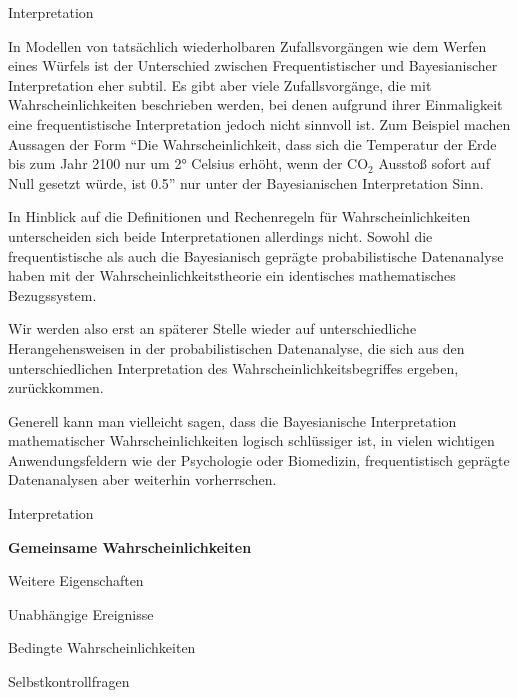 \documentclass[
  8pt,
  ignorenonframetext,
]{beamer}
\begin{document}
\begin{frame}{Interpretation}
\protect\hypertarget{interpretation-2}{}
\small

In Modellen von tatsächlich wiederholbaren Zufallsvorgängen wie dem
Werfen eines Würfels ist der Unterschied zwischen Frequentistischer und
Bayesianischer Interpretation eher subtil. Es gibt aber viele
Zufallsvorgänge, die mit Wahrscheinlichkeiten beschrieben werden, bei
denen aufgrund ihrer Einmaligkeit eine frequentistische Interpretation
jedoch nicht sinnvoll ist. Zum Beispiel machen Aussagen der Form ``Die
Wahrscheinlichkeit, dass sich die Temperatur der Erde bis zum Jahr 2100
nur um 2° Celsius erhöht, wenn der CO\(_2\) Ausstoß sofort auf Null
gesetzt würde, ist 0.5'' nur unter der Bayesianischen Interpretation
Sinn.

In Hinblick auf die Definitionen und Rechenregeln für
Wahrscheinlichkeiten unterscheiden sich beide Interpretationen
allerdings nicht. Sowohl die frequentistische als auch die Bayesianisch
geprägte probabilistische Datenanalyse haben mit der
Wahrscheinlichkeitstheorie ein identisches mathematisches Bezugssystem.

Wir werden also erst an späterer Stelle wieder auf unterschiedliche
Herangehensweisen in der probabilistischen Datenanalyse, die sich aus
den unterschiedlichen Interpretation des Wahrscheinlichkeitsbegriffes
ergeben, zurückkommen.

Generell kann man vielleicht sagen, dass die Bayesianische
Interpretation mathematischer Wahrscheinlichkeiten logisch schlüssiger
ist, in vielen wichtigen Anwendungsfeldern wie der Psychologie oder
Biomedizin, frequentistisch geprägte Datenanalysen aber weiterhin
vorherrschen.
\end{frame}

\begin{frame}{}
\protect\hypertarget{section-6}{}
\vfill
\large

Interpretation

\textbf{Gemeinsame Wahrscheinlichkeiten}

Weitere Eigenschaften

Unabhängige Ereignisse

Bedingte Wahrscheinlichkeiten

Selbstkontrollfragen \vfill
\end{frame}
\end{document}
